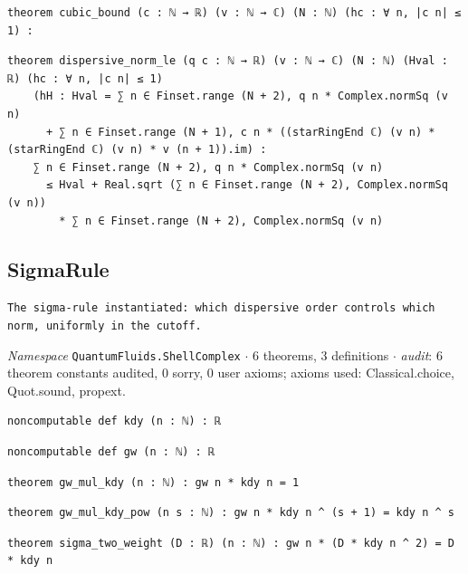 \begin{lstlisting}[style=leancat]
theorem cubic_bound (c : ℕ → ℝ) (v : ℕ → ℂ) (N : ℕ) (hc : ∀ n, |c n| ≤ 1) :
\end{lstlisting}

\begin{lstlisting}[style=leancat]
theorem dispersive_norm_le (q c : ℕ → ℝ) (v : ℕ → ℂ) (N : ℕ) (Hval : ℝ) (hc : ∀ n, |c n| ≤ 1)
    (hH : Hval = ∑ n ∈ Finset.range (N + 2), q n * Complex.normSq (v n)
      + ∑ n ∈ Finset.range (N + 1), c n * ((starRingEnd ℂ) (v n) * (starRingEnd ℂ) (v n) * v (n + 1)).im) :
    ∑ n ∈ Finset.range (N + 2), q n * Complex.normSq (v n)
      ≤ Hval + Real.sqrt (∑ n ∈ Finset.range (N + 2), Complex.normSq (v n))
        * ∑ n ∈ Finset.range (N + 2), Complex.normSq (v n)
\end{lstlisting}

\subsection{SigmaRule}\label{appA:SigmaRule}
{\footnotesize\raggedright\texttt{The sigma-\allowbreak{}rule instantiated: which dispersive order controls which norm,\allowbreak{} uniformly in the cutoff.\allowbreak{}}\par}
{\footnotesize\raggedright\emph{Namespace} \texttt{QuantumFluids.\allowbreak{}ShellComplex} $\cdot$ 6 theorems, 3 definitions $\cdot$ \emph{audit}: 6 theorem constants audited, 0 sorry, 0 user axioms; axioms used: Classical.choice, Quot.sound, propext.\par}
\vspace{1pt}
\begin{lstlisting}[style=leancat]
noncomputable def kdy (n : ℕ) : ℝ
\end{lstlisting}

\begin{lstlisting}[style=leancat]
noncomputable def gw (n : ℕ) : ℝ
\end{lstlisting}

\begin{lstlisting}[style=leancat]
theorem gw_mul_kdy (n : ℕ) : gw n * kdy n = 1
\end{lstlisting}

\begin{lstlisting}[style=leancat]
theorem gw_mul_kdy_pow (n s : ℕ) : gw n * kdy n ^ (s + 1) = kdy n ^ s
\end{lstlisting}

\begin{lstlisting}[style=leancat]
theorem sigma_two_weight (D : ℝ) (n : ℕ) : gw n * (D * kdy n ^ 2) = D * kdy n
\end{lstlisting}

